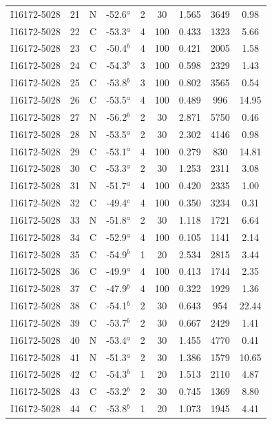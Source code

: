 \begin{table}
\begin{tabular}{ccccccccc}
I16172-5028 & 21 & N & -52.6$^{a}$ & 2 & 30 & 1.565 & 3649 & 0.98 \\
I16172-5028 & 22 & C & -53.3$^{a}$ & 4 & 100 & 0.433 & 1323 & 5.66 \\
I16172-5028 & 23 & C & -50.4$^{b}$ & 4 & 100 & 0.421 & 2005 & 1.58 \\
I16172-5028 & 24 & C & -54.3$^{b}$ & 3 & 100 & 0.598 & 2329 & 1.43 \\
I16172-5028 & 25 & C & -53.8$^{b}$ & 3 & 100 & 0.802 & 3565 & 0.54 \\
I16172-5028 & 26 & C & -53.5$^{a}$ & 4 & 100 & 0.489 & 996 & 14.95 \\
I16172-5028 & 27 & N & -56.2$^{b}$ & 2 & 30 & 2.871 & 5750 & 0.46 \\
I16172-5028 & 28 & N & -53.5$^{a}$ & 2 & 30 & 2.302 & 4146 & 0.98 \\
I16172-5028 & 29 & C & -53.1$^{a}$ & 4 & 100 & 0.279 & 830 & 14.81 \\
I16172-5028 & 30 & C & -53.3$^{a}$ & 2 & 30 & 1.253 & 2311 & 3.08 \\
I16172-5028 & 31 & N & -51.7$^{a}$ & 4 & 100 & 0.420 & 2335 & 1.00 \\
I16172-5028 & 32 & C & -49.4$^{c}$ & 4 & 100 & 0.350 & 3234 & 0.31 \\
I16172-5028 & 33 & N & -51.8$^{a}$ & 2 & 30 & 1.118 & 1721 & 6.64 \\
I16172-5028 & 34 & C & -52.9$^{a}$ & 4 & 100 & 0.105 & 1141 & 2.14 \\
I16172-5028 & 35 & C & -54.9$^{b}$ & 1 & 20 & 2.534 & 2815 & 3.44 \\
I16172-5028 & 36 & C & -49.9$^{a}$ & 4 & 100 & 0.413 & 1744 & 2.35 \\
I16172-5028 & 37 & C & -47.9$^{b}$ & 4 & 100 & 0.322 & 1929 & 1.36 \\
I16172-5028 & 38 & C & -54.1$^{b}$ & 2 & 30 & 0.643 & 954 & 22.44 \\
I16172-5028 & 39 & C & -53.7$^{b}$ & 2 & 30 & 0.667 & 2429 & 1.41 \\
I16172-5028 & 40 & N & -53.4$^{a}$ & 2 & 30 & 1.455 & 4770 & 0.41 \\
I16172-5028 & 41 & N & -51.3$^{a}$ & 2 & 30 & 1.386 & 1579 & 10.65 \\
I16172-5028 & 42 & C & -54.3$^{b}$ & 1 & 20 & 1.513 & 2110 & 4.87 \\
I16172-5028 & 43 & C & -53.2$^{b}$ & 2 & 30 & 0.745 & 1369 & 8.80 \\
I16172-5028 & 44 & C & -53.8$^{b}$ & 1 & 20 & 1.073 & 1945 & 4.41 \\

\end{tabular}
\end{table}
